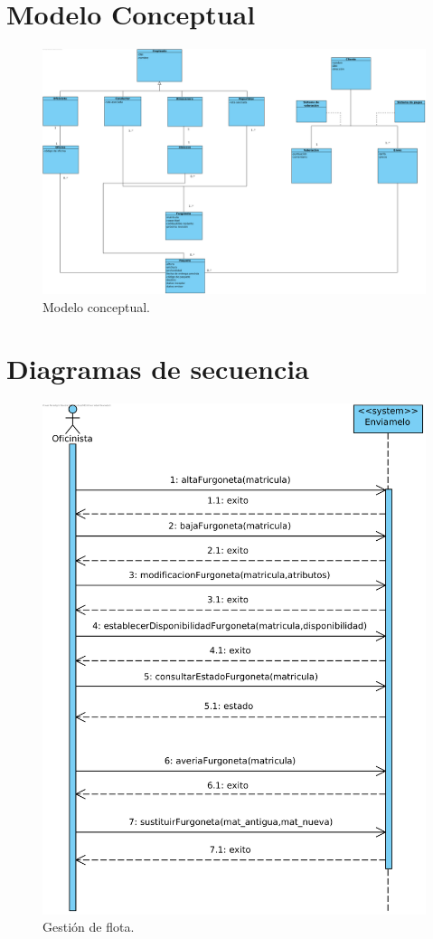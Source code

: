 \documentclass[12pt,spanish]{article}
\begin{document}
\section{Modelo Conceptual}

\begin{figure}[H]
\centering
\includegraphics[scale=0.35]{modelo_conceptual.png}
\caption{Modelo conceptual.}
\end{figure}

\section{Diagramas de secuencia}

\begin{figure}[H]
\centering
\includegraphics[scale=1]{gestion_flota.png}
\caption{Gestión de flota.}
\end{figure}
\end{document}
